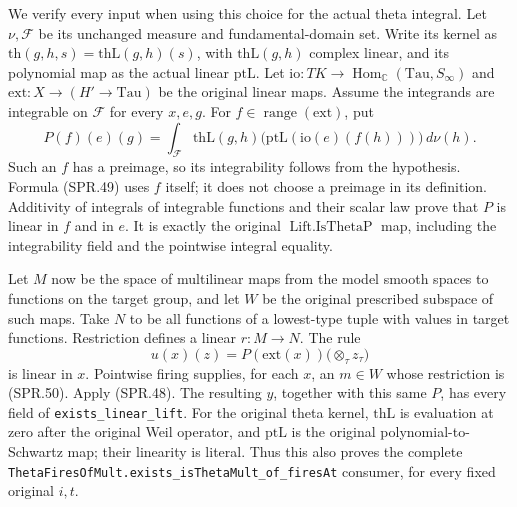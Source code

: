 We verify every input when using this choice for the actual
theta integral.  Let \(\nu,\mathcal F\) be its unchanged
measure and fundamental-domain set.  Write its kernel as
\(\mathrm{th}(g,h,s)=\mathrm{thL}(g,h)(s)\), with
\(\mathrm{thL}(g,h)\) complex linear, and its polynomial map as
the actual linear \(\mathrm{ptL}\).
Let \(\mathrm{io}:TK\to\operatorname{Hom}_{\mathbb C}
(\mathrm{Tau},S_\infty)\) and
\(\mathrm{ext}:X\to(H'\to\mathrm{Tau})\) be the original
linear maps.  Assume the integrands are integrable on
\(\mathcal F\) for every \(x,e,g\).
For \(f\in\operatorname{range}(\mathrm{ext})\), put
\[
 P(f)(e)(g)=\int_{\mathcal F}
   \mathrm{thL}(g,h)
     \bigl(\mathrm{ptL}(\mathrm{io}(e)(f(h)))\bigr)\,d\nu(h).
 \tag{SPR.49}
\]
Such an \(f\) has a preimage, so its integrability follows from
the hypothesis.  Formula (SPR.49) uses \(f\) itself; it does not
choose a preimage in its definition.  Additivity of integrals
of integrable functions and their scalar law prove that \(P\)
is linear in \(f\) and in \(e\).  It is exactly the original
\(\operatorname{Lift.IsThetaP}\) map, including the integrability
field and the pointwise integral equality.

Let \(M\) now be the space of multilinear maps from the model
smooth spaces to functions on the target group, and let
\(W\) be the original prescribed subspace of such maps.
Take \(N\) to be all functions of a lowest-type tuple with
values in target functions.  Restriction defines a linear
\(r:M\to N\).  The rule
\[
 u(x)(z)=P(\mathrm{ext}(x))
                       \bigl(\mathop{\otimes}_\tau z_\tau\bigr)
 \tag{SPR.50}
\]
is linear in \(x\).  Pointwise firing supplies, for each \(x\),
an \(m\in W\) whose restriction is (SPR.50).  Apply (SPR.48).
The resulting \(y\), together with this same \(P\), has every
field of \texttt{exists\_\allowbreak linear\_\allowbreak lift}.
For the original theta kernel, \(\mathrm{thL}\) is evaluation
at zero after the original Weil operator, and
\(\mathrm{ptL}\) is the original polynomial-to-Schwartz map;
their linearity is literal.  Thus this also proves the complete
\texttt{ThetaFiresOfMult.\allowbreak exists\_\allowbreak isThetaMult\_\allowbreak of\_\allowbreak firesAt}
consumer, for every fixed original \(i,t\).

